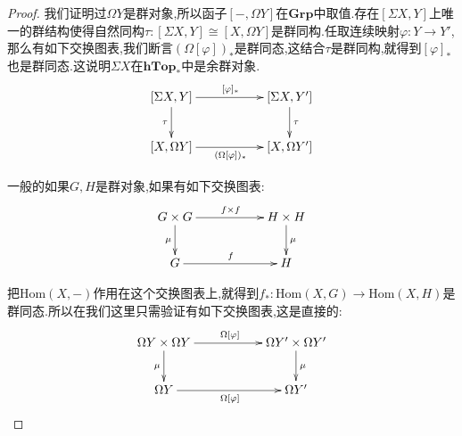 \begin{enumerate}
\begin{proof}
    	我们证明过$\Omega Y$是群对象,所以函子$[-,\Omega Y]$在$\textbf{Grp}$中取值.存在$[\Sigma X,Y]$上唯一的群结构使得自然同构$\tau:[\Sigma X,Y]\cong[X,\Omega Y]$是群同构.任取连续映射$\varphi:Y\to Y'$,那么有如下交换图表,我们断言$(\Omega[\varphi])_*$是群同态,这结合$\tau$是群同构,就得到$[\varphi]_*$也是群同态.这说明$\Sigma X$在$\textbf{hTop}_*$中是余群对象.
    	$$\xymatrix{[\Sigma X,Y]\ar[rr]^{[\varphi]_*}\ar[d]_{\tau}&&[\Sigma X,Y']\ar[d]^{\tau}\\[X,\Omega Y]\ar[rr]_{(\Omega[\varphi])_*}&&[X,\Omega Y']}$$
    	
    	一般的如果$G,H$是群对象,如果有如下交换图表:
    	$$\xymatrix{G\times G\ar[rr]^{f\times f}\ar[d]_{\mu}&&H\times H\ar[d]^{\mu}\\G\ar[rr]^f&&H}$$
    	
    	把$\mathrm{Hom}(X,-)$作用在这个交换图表上,就得到$f_*:\mathrm{Hom}(X,G)\to\mathrm{Hom}(X,H)$是群同态.所以在我们这里只需验证有如下交换图表,这是直接的:
    	$$\xymatrix{\Omega Y\times\Omega Y\ar[rr]^{\Omega[\varphi]}\ar[d]_{\mu}&&\Omega Y'\times\Omega Y'\ar[d]^{\mu}\\\Omega Y\ar[rr]_{\Omega[\varphi]}&&\Omega Y'}$$
    \end{proof}
\end{enumerate}

